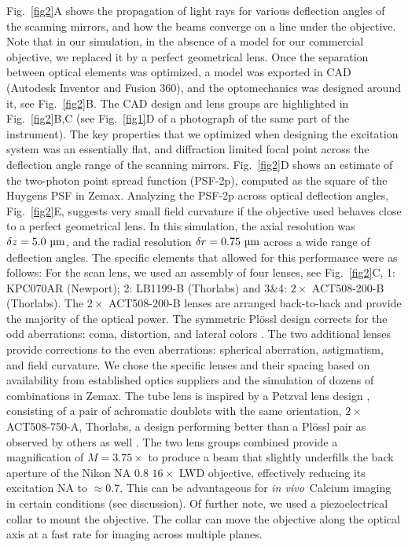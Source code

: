 \documentclass[10pt,letterpaper]{article}
\newcommand{\invivo}{\textit{in vivo}~}
\begin{document}
Fig.~\ref{fig2}A shows the propagation of light rays for various deflection angles of the scanning mirrors, and how the beams converge on a line under the objective. Note that in our simulation, in the absence of a model for our commercial objective, we replaced it by a perfect geometrical lens. Once the separation between optical elements was optimized, a model was exported in CAD (Autodesk Inventor and Fusion 360), and the optomechanics was designed around it, see Fig.~\ref{fig2}B. The CAD design and lens groups are highlighted in Fig.~\ref{fig2}B,C (see Fig.~\ref{fig1}D of a photograph of the same part of the instrument). The key properties that we optimized when designing the excitation system was an essentially flat, and diffraction limited focal point across the deflection angle range of the scanning mirrors. Fig.~\ref{fig2}D shows an estimate of the two-photon point spread function (PSF-2p), computed as the square of the Huygens PSF in Zemax. Analyzing the PSF-2p across optical deflection angles, Fig.~\ref{fig2}E, suggests very small field curvature if the objective used behaves close to a perfect geometrical lens. In this simulation, the axial resolution was $\delta z = 5.0\text{ \textmu m}$, and the radial resolution $\delta r = 0.75\text{ \textmu m}$ across a wide range of deflection angles.\newline
The specific elements that allowed for this performance were as follows: For the scan lens, we used an assembly of four lenses, see Fig.~\ref{fig2}C, 1: KPC070AR (Newport); 2: LB1199-B (Thorlabs) and 3\&4: $2\times$ ACT508-200-B (Thorlabs). The $2\times$ ACT508-200-B lenses are arranged back-to-back and provide the majority of the optical power. The symmetric Pl\"ossl design corrects for the odd aberrations: coma, distortion, and lateral colors \cite{Negrean2014, Kidger2001}. The two additional lenses provide corrections to the even aberrations: spherical aberration, astigmatism, and field curvature. We chose the specific lenses and their spacing based on availability from established optics suppliers and the simulation of dozens of combinations in Zemax. The tube lens is inspired by a Petzval lens design \cite{Smith2007, Kidger2001}, consisting of a pair of achromatic doublets with the same orientation, $2\times$ ACT508-750-A, Thorlabs, a design performing better than a Pl\"ossl pair as observed by others as well \cite{Hong2022, Bumstead2018, Mayrhofer2015}.\newline
The two lens groups combined provide a magnification of $M=3.75\times$ to produce a beam that slightly underfills the back aperture of the Nikon NA 0.8 $16\times$ LWD objective, effectively reducing its excitation NA to $\approx0.7$. This can be advantageous for \invivo Calcium imaging in certain conditions (see discussion). Of further note, we used a piezoelectrical collar to mount the objective. The collar can move the objective along the optical axis at a fast rate for imaging across multiple planes. 
\end{document}
